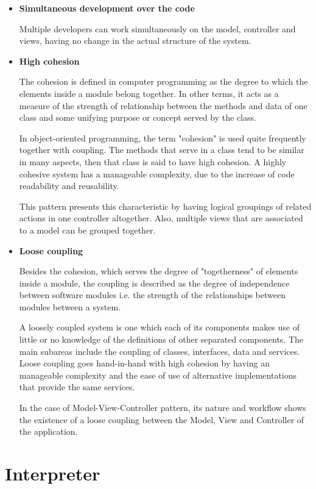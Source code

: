 \documentclass[12pt,a4paper,twoside]{report}
\begin{document}
\begin{itemize}
	\item \textbf{Simultaneous development over the code} 
	
	Multiple developers can work simultaneously on the model, controller and views, having no change in the actual structure of the system.
	\item \textbf{High cohesion}
			
	The cohesion is defined in computer programming as the degree to which the elements inside a module belong together. In other terms, it acts as a measure of the strength of relationship between the methods and data of one class and some unifying purpose or concept served by the class.
	
	In object-oriented programming, the term "cohesion" is used quite frequently together with coupling. The methods that serve in a class tend to be similar in many aspects, then that class is said to have high cohesion. A highly cohesive system has a manageable complexity, due to the increase of code readability and reusability. 
	
	This pattern presents this characteristic by having logical groupings of related actions in one controller altogether. Also, multiple views that are associated to a model can be grouped together. 
	
	\item \textbf{Loose coupling}
	
	Besides the cohesion, which serves the degree of "togetherness" of elements inside a module, the coupling is described as the degree of independence between software modules i.e. the strength of the relationships between modules between a system.
	
	A loosely coupled system is one which each of its components makes use of little or no knowledge of the definitions of other separated components. The main subareas include the coupling of classes, interfaces, data and services. Loose coupling goes hand-in-hand with high cohesion by having an manageable complexity and the ease of use of alternative implementations that provide the same services. 
	
	In the case of Model-View-Controller pattern, its nature and workflow shows the existence of a loose coupling between the Model, View and Controller of the application.	

\end{itemize} 

	
\section{Interpreter}
\end{document}

